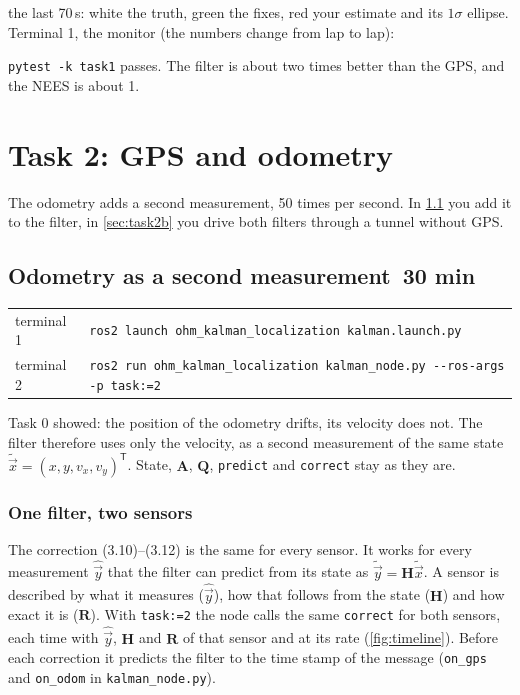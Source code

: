 \documentclass[11pt,a4paper,parskip=half]{scrartcl}
\makeatletter
\newcommand{\thema}[1]{\texttt{#1}}
\newcommand{\datei}[1]{\texttt{#1}}
\newcommand{\minutes}[1]{\texorpdfstring{\hfill{\normalsize\mdseries\color{ohmgrey}\faClock[regular]~#1 min}}{}}
\newcommand{\mat}[1]{\mathbf{#1}}
\newcommand{\T}{^{\mathsf{T}}}
\newcommand{\solution}[1]{\ifdefined\withsolution\InputIfFileExists{solutions/#1}{}{}\fi}
\newcommand{\running}[2]{\begin{tcolorbox}[base, colback=black!3, borderline west={2.5pt}{0pt}{ohmgrey},
        title={\faTerminal~Running}, coltitle=ohmgrey, colbacktitle=black!3, fonttitle=\small\bfseries,
        toptitle=2pt, bottomtitle=0pt, fontupper=\small]
  \begin{tabularx}{\linewidth}{@{}>{\color{ohmgrey}}l >{\raggedright\arraybackslash}X@{}}
    terminal 1 & \texttt{ros2 launch ohm\_kalman\_localization kalman.launch.py#1} \\
    terminal 2 & \texttt{ros2 run ohm\_kalman\_localization kalman\_node.py -\kern0pt-ros-args #2}
  \end{tabularx}
\end{tcolorbox}}
\newcommand{\expected}[2][]{\begin{seebox}
  \centering\resizebox{0.5\linewidth}{!}{}\par\smallskip
  \raggedright{\footnotesize\color{ohmgrey}#1the last 70\,s: white the truth, green the fixes, red your
    estimate and its \(1\sigma\) ellipse. Terminal 1, the monitor (the numbers change from lap to lap):}
  
\end{seebox}}
\makeatother
\begin{document}
\expected[]{task1}

\begin{checkpoint}
\thema{pytest -k task1} passes. The filter is about two times better than the GPS, and the NEES is about 1.
\end{checkpoint}
\solution{task1b}

\newpage
\section{Task 2: GPS and odometry}
\label{sec:task2}
The odometry adds a second measurement, 50 times per second. In \cref{sec:task2a} you add it to the filter, in
\cref{sec:task2b} you drive both filters through a tunnel without GPS.

\subsection{Odometry as a second measurement\minutes{30}}
\label{sec:task2a}
\running{}{-p task:=2}

Task 0 showed: the position of the odometry drifts, its velocity does not. The filter therefore uses only the
velocity, as a second measurement of the same state \(\tilde{\vec x} = (x, y, v_x, v_y)\T\). State, \(\mat A\),
\(\mat Q\), \thema{predict} and \thema{correct} stay as they are.

\subsubsection*{One filter, two sensors}
The correction (3.10)--(3.12) is the same for every sensor. It works for every measurement \(\hat{\vec y}\)
that the filter can predict from its state as \(\tilde{\vec y} = \mat H \tilde{\vec x}\). A sensor is described by
what it measures (\(\hat{\vec y}\)), how that follows from the state (\(\mat H\)) and how exact it is (\(\mat R\)).
With \thema{task:=2} the node calls the same \thema{correct} for both sensors, each time with \(\hat{\vec y}\),
\(\mat H\) and \(\mat R\) of that sensor and at its rate (\cref{fig:timeline}). Before each
correction it predicts the filter to the time stamp of the message (\thema{on\_gps} and \thema{on\_odom} in
\datei{kalman\_node.py}).
\end{document}
